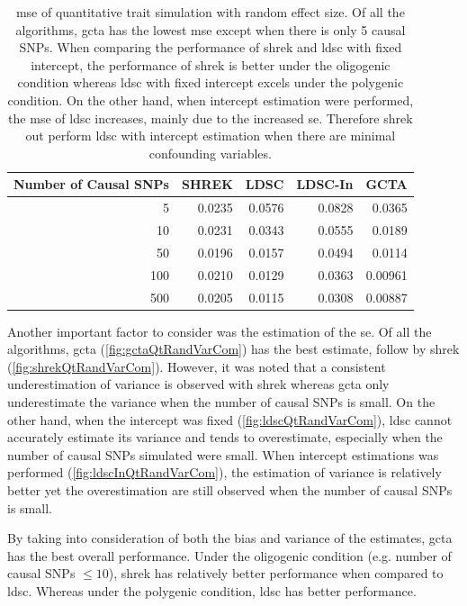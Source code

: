 \documentclass[12pt]{scrbook}
\begin{document}
\begin{table}
	\centering
	\begin{tabular}{rrrrr}
		\toprule
		Number of Causal SNPs&	SHREK&	LDSC&	LDSC-In&	GCTA \\
		\midrule
		5	&	0.0235	&	0.0576	&	0.0828	&	0.0365\\
		10	&	0.0231	&	0.0343	&	0.0555	&	0.0189\\
		50	&	0.0196	&	0.0157	&	0.0494	&	0.0114\\
		100	&	0.0210	&	0.0129	&	0.0363	&	0.00961\\
		500	&	0.0205	&	0.0115	&	0.0308	&	0.00887\\
		\bottomrule
	\end{tabular}
	\caption[MSE of Quantitative Trait Simulation with Random Effect Size]{
		\Gls{mse} of quantitative trait simulation with random effect size.
		Of all the algorithms, \gls{gcta} has the lowest \gls{mse} except when there is only 5 causal \glspl{SNP}.
		When comparing the performance of \gls{shrek} and \gls{ldsc} with fixed intercept, the performance of \gls{shrek} is better under the oligogenic condition whereas \gls{ldsc} with fixed intercept excels under the polygenic condition. 
		On the other hand, when intercept estimation were performed, the \gls{mse} of \gls{ldsc} increases, mainly due to the increased \gls{se}. 
		Therefore \gls{shrek} out perform \gls{ldsc} with intercept estimation when there are minimal confounding variables.
	}
	\label{tab:mseQtRandom}
\end{table}
Another important factor to consider was the estimation of the \gls{se}. 
Of all the algorithms, \gls{gcta} (\cref{fig:gctaQtRandVarCom}) has the best estimate, follow by \gls{shrek} (\cref{fig:shrekQtRandVarCom}).
However, it was noted that a consistent underestimation of variance is observed with \gls{shrek} whereas \gls{gcta} only underestimate the variance when the number of causal \glspl{SNP} is small.
On the other hand, when the intercept was fixed (\cref{fig:ldscQtRandVarCom}), \gls{ldsc} cannot accurately estimate its variance and tends to overestimate, especially when the number of causal \glspl{SNP} simulated were small. 
When intercept estimations was performed (\cref{fig:ldscInQtRandVarCom}), the estimation of variance is relatively better yet the overestimation are still observed when the number of causal \glspl{SNP} is small. 

By taking into consideration of both the bias and variance of the estimates, \gls{gcta} has the best overall performance. 
Under the oligogenic condition (e.g. number of causal \glspl{SNP} $\le10$), \gls{shrek} has relatively better performance when compared to \gls{ldsc}.
Whereas under the polygenic condition, \gls{ldsc} has better performance. 
\end{document}
